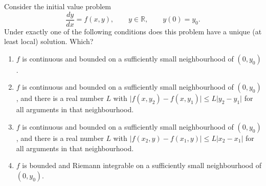 \begin{exercise}
\label{ex:kobel_picard_lindeloef_single_choice}
Consider the initial value problem
\[\frac{dy}{dx} = f(x,y), \qquad y \in \mathbb{R}, \qquad y(0) = y_0 .\]
Under exactly one of the following conditions does this problem have a unique (at least local)
solution. Which?
\begin{enumerate}[label=\textbf{(\alph*)}]
  \item $f$ is continuous and bounded on a sufficiently small neighbourhood of $(0,y_0)$.
  \item $f$ is continuous and bounded on a sufficiently small neighbourhood of $(0,y_0)$, and
    there is a real number $L$ with $\lvert f(x,y_2)-f(x,y_1)\rvert \le L\lvert y_2-y_1\rvert$
    for all arguments in that neighbourhood.
  \item $f$ is continuous and bounded on a sufficiently small neighbourhood of $(0,y_0)$, and
    there is a real number $L$ with $\lvert f(x_2,y)-f(x_1,y)\rvert \le L\lvert x_2-x_1\rvert$
    for all arguments in that neighbourhood.
  \item $f$ is bounded and Riemann integrable on a sufficiently small neighbourhood of
    $(0,y_0)$.
\end{enumerate}
\end{exercise}

